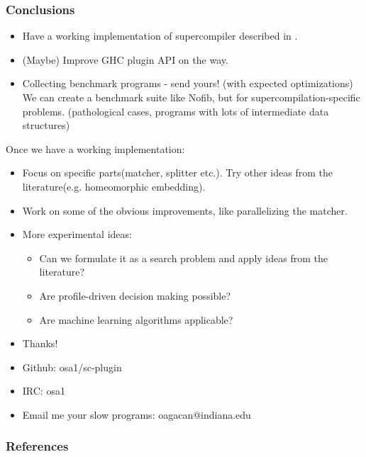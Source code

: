 \documentclass{beamer}
\begin{document}
\begin{frame}
    \frametitle{Conclusions}

    \begin{itemize}[<+->]
        \item[]
            Have a working implementation of supercompiler described in
            \citet{callbyneed-sc}.
        \item[]
            (Maybe) Improve GHC plugin API on the way.
        \item[]
            Collecting benchmark programs - send yours! (with expected
            optimizations)
            \newline
            We can create a benchmark suite like Nofib, but for
            supercompilation-specific problems. (pathological cases, programs
            with lots of intermediate data structures)
    \end{itemize}
\end{frame}

\begin{frame}
    Once we have a working implementation:
    \begin{itemize}
        \item
            Focus on specific parts(matcher, splitter etc.). Try other
            ideas from the literature(e.g. homeomorphic embedding).
        \item
            Work on some of the obvious improvements, like parallelizing
            the matcher.
        \item
            More experimental ideas:
            \begin{itemize}
                \item[]
                    Can we formulate it as a search problem and apply
                    ideas from the literature?
                \item[]
                    Are profile-driven decision making possible?
                \item[]
                    Are machine learning algorithms applicable?
            \end{itemize}
    \end{itemize}
\end{frame}

\begin{frame}
    \centering
    \begin{itemize}
        \itemsep1em

        \item[]
            \begin{huge}
                Thanks!
            \end{huge}

        \item[]
            Github: osa1/sc-plugin

        \item[]
            IRC: osa1

        \item[]
            Email me your slow programs: oagacan@indiana.edu
    \end{itemize}
\end{frame}

\begin{frame}[allowframebreaks]
    \frametitle{References}

    
    
\end{frame}
\end{document}
